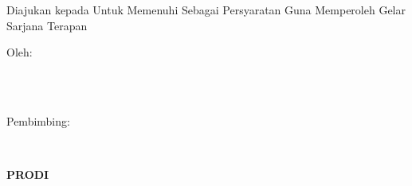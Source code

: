 \newpage
\begin{center}
    \begin{doublespace}
        \textbf{\large{\MakeUppercase{\judulid}}}\\[2.5cm]
    \end{doublespace}

    \textbf{\MakeUppercase{\large{\tipe}}}\\[0.5cm]
    \begin{onehalfspace}
        Diajukan kepada {\fakultas} {\universitas} Untuk Memenuhi Sebagai Persyaratan Guna Memperoleh Gelar Sarjana Terapan\\[1.8cm]
    \end{onehalfspace}

    \large Oleh: \\
    \begin{onehalfspace}
        \large{\penulis} \\
        \large{\nim}\\[1.5cm]
    \end{onehalfspace}
    \vspace{1.5cm}

    \large Pembimbing: \\
    \begin{onehalfspace}
        \large{\pembimbing} \\
    \end{onehalfspace}

    \vfill

    \textbf{\large \MakeUppercase{Prodi \prodi}}\\
    \textbf{\large \MakeUppercase{\fakultas}}\\
    \textbf{\large \MakeUppercase{\universitas}}\\
    \textbf{\large \the\year{}}\\
\end{center}
